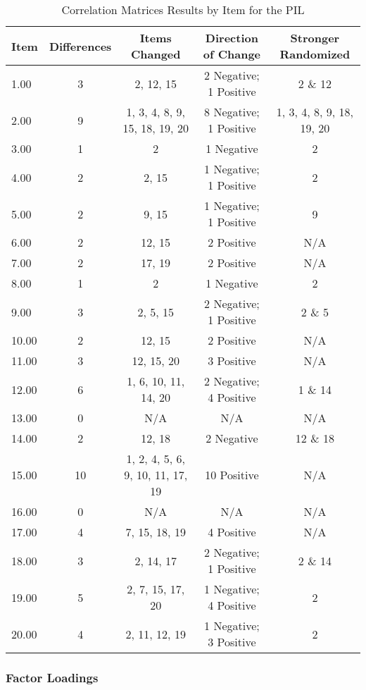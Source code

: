 \documentclass[english,man, mask]{apa6}
\theoremstyle{definition}
\theoremstyle{definition}
\theoremstyle{definition}
\theoremstyle{remark}
\begin{document}
\begin{table}[tbp]
\begin{center}
\begin{threeparttable}
\caption{\label{tab:cor-table-pil}Correlation Matrices Results by Item for the PIL}
\small{
\begin{tabular}{lcccc}
\toprule
Item & Differences & Items Changed & Direction of Change & Stronger Randomized\\
\midrule
1.00 & 3 & 2, 12, 15 & 2 Negative; 1 Positive & 2 \& 12\\
2.00 & 9 & 1, 3, 4, 8, 9, 
15, 18, 19, 20 & 8 Negative; 1 Positive & 1, 3, 4, 8, 9, 
18, 19, 20\\
3.00 & 1 & 2 & 1 Negative & 2\\
4.00 & 2 & 2, 15 & 1 Negative; 1 Positive & 2\\
5.00 & 2 & 9, 15 & 1 Negative; 1 Positive & 9\\
6.00 & 2 & 12, 15 & 2 Positive & N/A\\
7.00 & 2 & 17, 19 & 2 Positive & N/A\\
8.00 & 1 & 2 & 1 Negative & 2\\
9.00 & 3 & 2, 5, 15 & 2 Negative; 1 Positive & 2 \& 5\\
10.00 & 2 & 12, 15 & 2 Positive & N/A\\
11.00 & 3 & 12, 15, 20 & 3 Positive & N/A\\
12.00 & 6 & 1, 6, 10, 11, 14, 20 & 2 Negative; 4 Positive & 1 \& 14\\
13.00 & 0 & N/A & N/A & N/A\\
14.00 & 2 & 12, 18 & 2 Negative & 12 \& 18\\
15.00 & 10 & 1, 2, 4, 5, 6, 9, 
10, 11, 17, 19 & 10 Positive & N/A\\
16.00 & 0 & N/A & N/A & N/A\\
17.00 & 4 & 7, 15, 18, 19 & 4 Positive & N/A\\
18.00 & 3 & 2, 14, 17 & 2 Negative; 1 Positive & 2 \& 14\\
19.00 & 5 & 2, 7, 15, 17, 20 & 1 Negative; 4 Positive & 2\\
20.00 & 4 & 2, 11, 12, 19 & 1 Negative; 3 Positive & 2\\
\bottomrule
\end{tabular}
}
\end{threeparttable}
\end{center}
\end{table}

\subsubsection{Factor Loadings}\label{factor-loadings}
\end{document}
